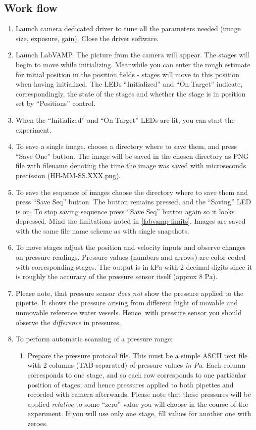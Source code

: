 \subsection{Work flow}\label{labvamp-work}
\begin{enumerate}
	\item Launch camera dedicated driver to tune all the parameters needed (image size, exposure, gain). Close the driver software.
	\item Launch LabVAMP. The picture from the camera will appear. The stages will begin to move while initializing. Meanwhile you can enter the rough estimate for initial position in the position fields - stages will move to this position when having initialized. The LEDs ``Initialized'' and ``On Target'' indicate, correspondingly, the state of the stages and whether the stage is in position set by ``Positions'' control.
	\item When the ``Initialized'' and ``On Target'' LEDs are lit, you can start the experiment.
	\item To save a single image, choose a directory where to save them, and press ``Save One'' button. The image will be saved in the chosen directory as PNG file with filename denoting the time the image was saved with microseconds precission (HH-MM-SS.XXX.png).
	\item To save the sequence of images choose the directory where to save them and press ``Save Seq'' button. The button remains pressed, and the ``Saving'' LED is on. To stop saving sequence press ``Save Seq'' button again so it looks depressed. Mind the limitations noted in \ref{labvamp-limits}. Images are saved with the same file name scheme as with single snapshots.
	\item To move stages adjust the position and velocity inputs and observe changes on pressure readings. Pressure values (numbers and arrows) are color-coded with corresponding stages. The output is in kPa with 2 decimal digits since it is roughly the accuracy of the pressure sensor itself (approx 8 Pa).
	\item Please note, that pressure sensor \emph{does not} show the pressure applied to the pipette. It shows the pressure arising from different hight of movable and unmovable reference water vessels. Hence, with pressure sensor you should observe the \emph{difference} in pressures.
	\item To perform automatic scanning of a pressure range:
	\begin{enumerate}
		\item Prepare the pressure protocol file. This must be a simple ASCII text file with 2 columns (TAB separated) of pressure values \emph{in Pa}. Each column corresponds to one stage, and so each row corresponds to one particular position of stages, and hence pressures applied to both pipettes and recorded with camera afterwards. Please note that these pressures will be applied \emph{relative} to some ``zero''-value you will choose in the course of the experiment. If you will use only one stage, fill values for another one with zeroes.

\end{enumerate}
\end{enumerate}
